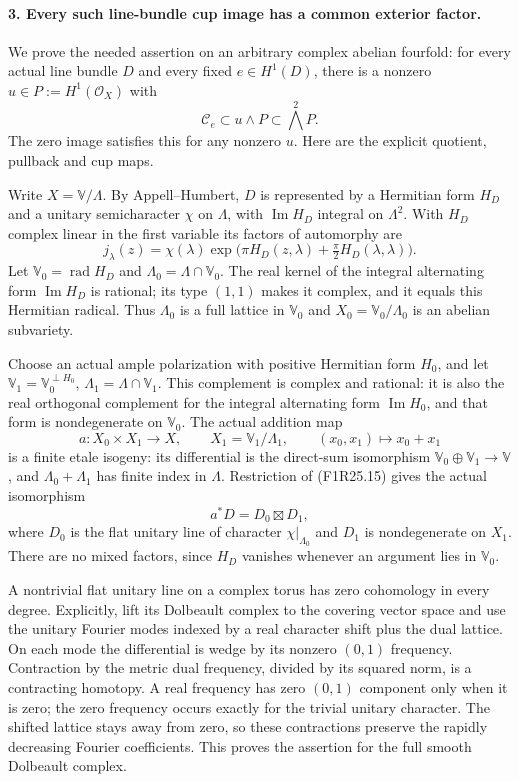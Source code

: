 \paragraph{3. Every such line-bundle cup image has a common exterior factor.}
We prove the needed assertion on an arbitrary
complex abelian fourfold: for every actual line
bundle $D$ and every fixed $e\in H^1(D)$, there
is a nonzero $u\in P:=H^1(\mathcal O_X)$ with
\[
                              \mathcal C_e\subset u\wedge P
                                   \subset\bigwedge^2P.
 \tag{F1R25.14}
\]
The zero image satisfies this for any nonzero $u$.
Here are the explicit quotient, pullback and cup maps.

Write $X=\mathbb V/\Lambda$. By Appell--Humbert,
$D$ is represented by a Hermitian form $H_D$ and
a unitary semicharacter $\chi$ on $\Lambda$, with
$\operatorname{Im}H_D$ integral on $\Lambda^2$.
With $H_D$ complex linear in the first variable
its factors of automorphy are
\[
 j_\lambda(z)=\chi(\lambda)
       \exp\bigl(\pi H_D(z,\lambda)+\tfrac{\pi}{2}
                               H_D(\lambda,\lambda)\bigr).
 \tag{F1R25.15}
\]
Let $\mathbb V_0=\operatorname{rad}H_D$ and
$\Lambda_0=\Lambda\cap\mathbb V_0$. The real kernel
of the integral alternating form
$\operatorname{Im}H_D$ is rational; its type $(1,1)$
makes it complex, and it equals this Hermitian
radical. Thus $\Lambda_0$ is a full lattice in
$\mathbb V_0$ and $X_0=\mathbb V_0/\Lambda_0$ is
an abelian subvariety.

Choose an actual ample polarization with positive
Hermitian form $H_0$, and let
$\mathbb V_1=\mathbb V_0^{\perp H_0}$,
$\Lambda_1=\Lambda\cap\mathbb V_1$.
This complement is complex and rational: it is
also the real orthogonal complement for the
integral alternating form $\operatorname{Im}H_0$,
and that form is nondegenerate on $\mathbb V_0$.
The actual addition map
\[
 a:X_0\times X_1\longrightarrow X,\qquad
       X_1=\mathbb V_1/\Lambda_1,\qquad (x_0,x_1)\longmapsto x_0+x_1
 \tag{F1R25.16}
\]
is a finite etale isogeny: its differential is the
direct-sum isomorphism
$\mathbb V_0\oplus\mathbb V_1\to\mathbb V$, and
$\Lambda_0+\Lambda_1$ has finite index in $\Lambda$.
Restriction of (F1R25.15) gives the actual isomorphism
\[
                        a^*D=D_0\boxtimes D_1,
 \tag{F1R25.17}
\]
where $D_0$ is the flat unitary line of character
$\chi|_{\Lambda_0}$ and $D_1$ is nondegenerate on
$X_1$. There are no mixed factors, since $H_D$
vanishes whenever an argument lies in $\mathbb V_0$.

A nontrivial flat unitary line on a complex torus
has zero cohomology in every degree. Explicitly,
lift its Dolbeault complex to the covering vector
space and use the unitary Fourier modes indexed by
a real character shift plus the dual lattice.
On each mode the differential is wedge by its
nonzero $(0,1)$ frequency. Contraction by the
metric dual frequency, divided by its squared norm,
is a contracting homotopy. A real frequency has
zero $(0,1)$ component only when it is zero;
the zero frequency occurs exactly for the trivial
unitary character. The shifted lattice stays
away from zero, so these contractions preserve
the rapidly decreasing Fourier coefficients.
This proves the assertion for the full smooth
Dolbeault complex.

